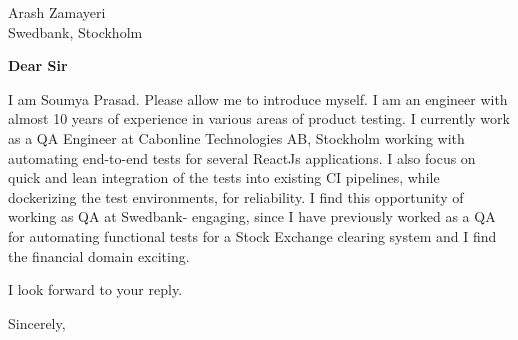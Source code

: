 \documentclass[10pt]{letter} %
\begin{document}

\begin{letter}{Arash Zamayeri \\ Swedbank, Stockholm} %


\opening{\textbf{Dear Sir}}
I am Soumya Prasad. Please allow me to introduce myself.  
I am an engineer with almost 10 years of experience in various
areas of product testing.
\hfill \break
I currently work as a QA Engineer at Cabonline Technologies AB, Stockholm
working with automating end-to-end tests for several ReactJs applications.
I also focus on quick and lean integration of the tests into existing
CI pipelines, while dockerizing the test environments, for reliability.
\hfill \break
I find this opportunity of working as QA at Swedbank- engaging, since I have
previously worked as a QA for automating functional tests for a Stock Exchange 
clearing system and I find the financial domain exciting. 



I look forward to your reply.

\vspace{2\parskip} %
\closing{Sincerely,}
\vspace{2\parskip} %




\end{letter}
 
\end{document}
